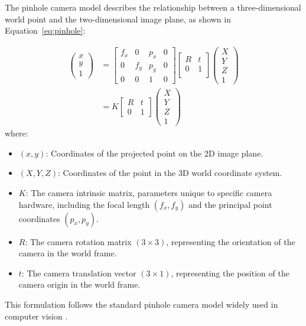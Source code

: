 \documentclass[journal]{IAENGtran}
\begin{document}
The pinhole camera model describes the relationship between a three-dimensional
world point and the two-dimensional image plane, as shown in Equation~\ref{eq:pinhole}:

\begin{equation} \label{eq:pinhole}
\begin{split}
\begin{pmatrix} x \\ y \\ 1 \end{pmatrix} &=
\begin{bmatrix}
f_{x} & 0 & p_{x} & 0 \\
0 & f_{y} & p_{y} & 0 \\
0 & 0 & 1     & 0
\end{bmatrix}
\begin{bmatrix}
R & t \\
0 & 1 \\
\end{bmatrix}
\begin{pmatrix} X \\ Y \\ Z \\ 1 \end{pmatrix} \\
&= K \begin{bmatrix} R & t \\ 0 & 1 \end{bmatrix}
\begin{pmatrix} X \\ Y \\ Z \\ 1 \end{pmatrix}
\end{split}
\end{equation}
where:
\begin{itemize}
    \item $(x, y)$: Coordinates of the projected point on the 2D image plane.
    \item $(X, Y, Z)$: Coordinates of the point in the 3D world coordinate system.
    \item $K$: The camera intrinsic matrix, parameters unique to specific camera hardware,
               including the focal length $(f_x, f_y)$ and the principal point coordinates $(p_x, p_y)$.
    \item $R$: The camera rotation matrix $(3 \times 3)$, representing the orientation
               of the camera in the world frame.
    \item $t$: The camera translation vector $(3 \times 1)$, representing the position
               of the camera origin in the world frame.
\end{itemize}
This formulation follows the standard pinhole camera model widely used in computer
vision \cite{Hartley2003,Szeliski2011}.
\end{document}
